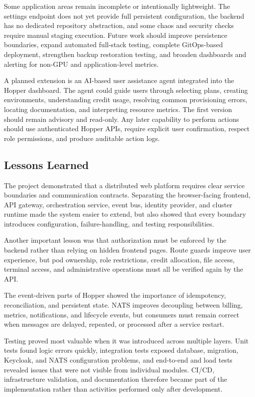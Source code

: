 \documentclass[12pt,a4paper]{article}
\begin{document}
Some application areas remain incomplete or intentionally lightweight. The settings
endpoint does not yet provide full persistent configuration, the backend has no dedicated
repository abstraction, and some chaos and security checks require manual staging
execution. Future work should improve persistence boundaries, expand automated
full-stack testing, complete GitOps-based deployment, strengthen backup restoration
testing, and broaden dashboards and alerting for non-GPU and application-level metrics.

A planned extension is an AI-based user assistance agent integrated into the Hopper
dashboard. The agent could guide users through selecting plans, creating environments,
understanding credit usage, resolving common provisioning errors, locating documentation,
and interpreting resource metrics. The first version should remain advisory and
read-only. Any later capability to perform actions should use authenticated Hopper APIs,
require explicit user confirmation, respect role permissions, and produce auditable action
logs.

\subsection{Lessons Learned}

The project demonstrated that a distributed web platform requires clear service
boundaries and communication contracts. Separating the browser-facing frontend, API
gateway, orchestration service, event bus, identity provider, and cluster runtime made the
system easier to extend, but also showed that every boundary introduces configuration,
failure-handling, and testing responsibilities.

Another important lesson was that authorization must be enforced by the backend rather
than relying on hidden frontend pages. Route guards improve user experience, but pod
ownership, role restrictions, credit allocation, file access, terminal access, and
administrative operations must all be verified again by the API.

The event-driven parts of Hopper showed the importance of idempotency, reconciliation,
and persistent state. NATS improves decoupling between billing, metrics, notifications,
and lifecycle events, but consumers must remain correct when messages are delayed,
repeated, or processed after a service restart.

Testing proved most valuable when it was introduced across multiple layers. Unit tests
found logic errors quickly, integration tests exposed database, migration, Keycloak, and
NATS configuration problems, and end-to-end and load tests revealed issues that were not
visible from individual modules. CI/CD, infrastructure validation, and documentation
therefore became part of the implementation rather than activities performed only after
development.
\end{document}
